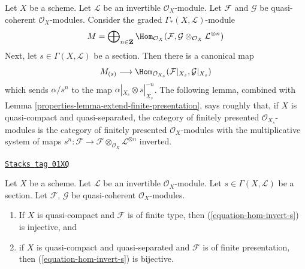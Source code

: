 Let $X$ be a scheme. Let $\mathcal{L}$ be an invertible $\mathcal{O}_X$-module.
Let $\mathcal{F}$ and $\mathcal{G}$ be quasi-coherent $\mathcal{O}_X$-modules.
Consider the graded $\Gamma_*(X, \mathcal{L})$-module
$$
M = \bigoplus\nolimits_{n \in \mathbf{Z}} \Hom_{\mathcal{O}_X}(\mathcal{F},
\mathcal{G} \otimes_{\mathcal{O}_X} \mathcal{L}^{\otimes n})
$$
Next, let $s \in \Gamma(X, \mathcal{L})$ be a section. Then there is a
canonical map
\begin{equation}
\label{equation-hom-invert-s}
M_{(s)} \longrightarrow
\Hom_{\mathcal{O}_{X_s}}(\mathcal{F}|_{X_s}, \mathcal{G}|_{X_s})
\end{equation}
which sends $\alpha/s^n$ to the map $\alpha|_{X_s} \otimes s|_{X_s}^{-n}$.
The following lemma, combined with
Lemma \ref{properties-lemma-extend-finite-presentation},
says roughly that, if $X$ is quasi-compact and quasi-separated,
the category of finitely presented $\mathcal{O}_{X_s}$-modules
is the category of finitely presented $\mathcal{O}_X$-modules
with the multiplicative system of maps
$s^n: \mathcal{F} \to
\mathcal{F} \otimes_{\mathcal{O}_X} \mathcal{L}^{\otimes n}$ inverted.

\begin{lemma}
\label{properties-lemma-section-maps-backwards}
\href{https://stacks.math.columbia.edu/tag/01XQ}{\texttt{Stacks tag 01XQ}}

Let $X$ be a scheme. Let $\mathcal{L}$ be an invertible $\mathcal{O}_X$-module.
Let $s \in \Gamma(X, \mathcal{L})$ be a section.
Let $\mathcal{F}$, $\mathcal{G}$ be quasi-coherent $\mathcal{O}_X$-modules.
\begin{enumerate}
\item If $X$ is quasi-compact and $\mathcal{F}$ is of finite type,
then (\ref{equation-hom-invert-s}) is injective, and
\item if $X$ is quasi-compact and quasi-separated and $\mathcal{F}$
is of finite presentation, then
(\ref{equation-hom-invert-s})
is bijective.
\end{enumerate}
\end{lemma}

